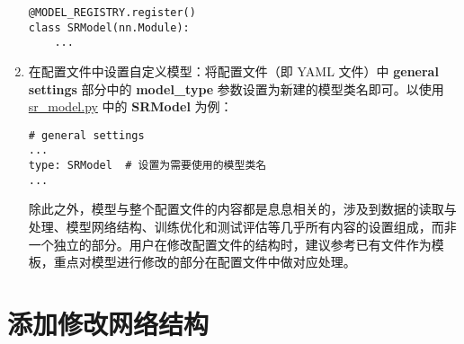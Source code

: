 \documentclass[../main.tex]{subfiles}
\begin{document}
\begin{enumerate}[第 1 步]
\begin{verbatim}
@MODEL_REGISTRY.register()
class SRModel(nn.Module):
    ...
\end{verbatim}

    \item 在配置文件中设置自定义模型：将配置文件（即 YAML 文件）中 \textbf{general settings} 部分中的 \textbf{model\_type} 参数设置为新建的模型类名即可。以使用 \href{https://github.com/XPixelGroup/BasicSR/tree/master/basicsr/models/sr_model.py}{sr\_model.py} 中的 \textbf{SRModel} 为例：

          \begin{verbatim}
# general settings
...
type: SRModel  # 设置为需要使用的模型类名
...
\end{verbatim}
          除此之外，模型与整个配置文件的内容都是息息相关的，涉及到数据的读取与处理、模型网络结构、训练优化和测试评估等几乎所有内容的设置组成，而非一个独立的部分。用户在修改配置文件的结构时，建议参考已有文件作为模板，重点对模型进行修改的部分在配置文件中做对应处理。

\end{enumerate}

\section{添加修改网络结构}\label{howto:add_arch}
\end{document}
